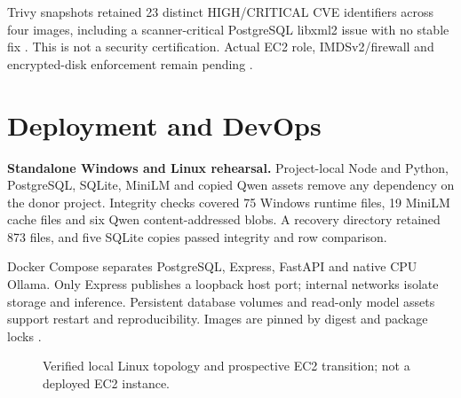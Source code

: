 Trivy snapshots retained 23 distinct HIGH/CRITICAL CVE identifiers across four images, including a scanner-critical PostgreSQL libxml2 issue with no stable fix \cite{DebCVE}. This is not a security certification. Actual EC2 role, IMDSv2/firewall and encrypted-disk enforcement remain pending \cite{OWASP,AWSIMDS,AWSSM}.

\section{Deployment and DevOps}

\textbf{Standalone Windows and Linux rehearsal.} Project-local Node and Python, PostgreSQL, SQLite, MiniLM and copied Qwen assets remove any dependency on the donor project. Integrity checks covered 75 Windows runtime files, 19 MiniLM cache files and six Qwen content-addressed blobs. A recovery directory retained 873 files, and five SQLite copies passed integrity and row comparison.

Docker Compose separates PostgreSQL, Express, FastAPI and native CPU Ollama. Only Express publishes a loopback host port; internal networks isolate storage and inference. Persistent database volumes and read-only model assets support restart and reproducibility. Images are pinned by digest and package locks \cite{Docker}.

\begin{figure}[htbp]
\centering
{}
\caption{Verified local Linux topology and prospective EC2 transition; not a deployed EC2 instance.}
\label{fig:topology}
\end{figure}

